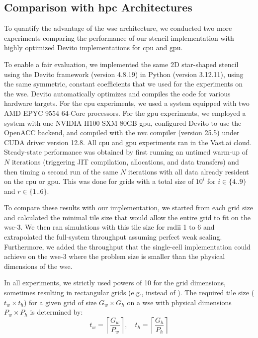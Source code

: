 \subsection{Comparison with \ac{hpc} Architectures}
To quantify the advantage of the \ac{wse} architecture, we conducted two more experiments comparing the performance of our stencil implementation with highly optimized Devito implementations for \ac{cpu} and \ac{gpu}. 

To enable a fair evaluation, we implemented the same 2D star-shaped stencil using the Devito framework (version 4.8.19) in Python (version 3.12.11), using the same symmetric, constant coefficients that we used for the experiments on the \ac{wse}.
Devito automatically optimizes and compiles the code for various hardware targets.
For the \ac{cpu} experiments, we used a system equipped with two AMD EPYC 9554 64-Core processors. For the \ac{gpu} experiments, we employed a system with one NVIDIA H100 SXM 80GB \ac{gpu}, configured Devito to use the OpenACC backend, and compiled with the nvc compiler (version 25.5) under CUDA driver version 12.8. All \ac{cpu} and \ac{gpu} experiments ran in the Vast.ai cloud.
Steady-state performance was obtained by first running an untimed warm-up of $N$ iterations (triggering JIT compilation, allocations, and data transfers) and then timing a second run of the same $N$ iterations with all data already resident on the \ac{cpu} or \ac{gpu}.
This was done for grids with a total size of $10^i$ for $i \in \{4..9\}$ and $r \in \{1..6\}$.

To compare these results with our implementation, we started from each grid size and calculated the minimal tile size that would allow the entire grid to fit on the \ac{wse}-3.
We then ran simulations with this tile size for radii 1 to 6 and extrapolated the full-system throughput assuming perfect weak scaling. Furthermore, we added the throughput that the single-cell implementation could achieve on the \ac{wse}-3 where the problem size is smaller than the physical dimensions of the \ac{wse}.

In all experiments, we strictly used powers of 10 for the grid dimensions, sometimes resulting in rectangular grids (e.g.,  instead of ). The required tile size ($t_w \times t_h$) for a given grid of size $G_w \times G_h$ on a \ac{wse} with physical dimensions $P_w \times P_h$ is determined by:
\begin{equation}
    t_w = \left\lceil \frac{G_w}{P_w} \right\rceil, \quad t_h = \left\lceil \frac{G_h}{P_h} \right\rceil
\end{equation}

